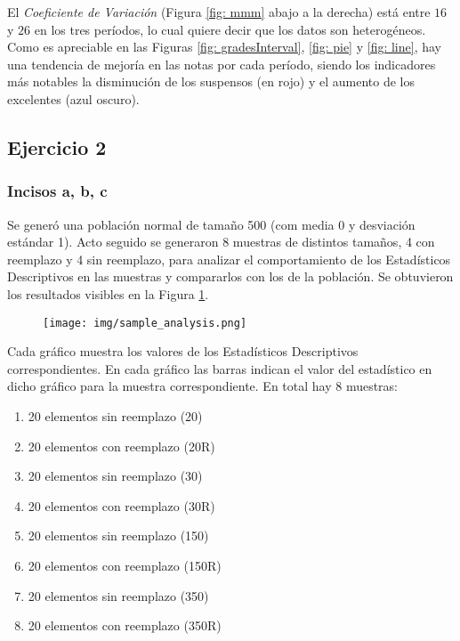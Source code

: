 \documentclass[a4paper,10pt,twocolumn]{article}
\begin{document}
	El \emph{Coeficiente de Variación} (Figura \ref{fig: mmm} abajo a la derecha) está entre $16$ y $26$ en los tres períodos, lo cual quiere decir que los datos son heterogéneos.\\
	
	Como es apreciable en las Figuras \ref{fig: gradesInterval}, \ref{fig: pie} y \ref{fig: line}, hay una tendencia de mejoría en las notas por cada período, siendo los indicadores más notables la disminución de los suspensos (en rojo) y el aumento de los excelentes (azul oscuro). \\
	\subsection{Ejercicio 2}\label{sub:results2}
		\subsubsection{Incisos a, b, c}
		Se generó una población normal de tamaño 500 (com media 0 y desviación estándar 1). Acto seguido se generaron 8 muestras de distintos tamaños, 4 con reemplazo y 4 sin reemplazo, para analizar el comportamiento de los Estadísticos Descriptivos en las muestras y compararlos con los de la población. Se obtuvieron los resultados visibles en la Figura \ref{fig: dcb}. \\
		
		\begin{figure}[htb]
			\begin{center}
				\texttt{[image: img/sample\_analysis.png]}
			\end{center}
			\label{fig: dcb}
		\end{figure}
		
		Cada gráfico muestra los valores de los Estadísticos Descriptivos correspondientes. En cada gráfico las barras indican el valor del estadístico en dicho gráfico para la muestra correspondiente. En total hay 8 muestras:
		
		\begin{enumerate}
			\item 20 elementos sin reemplazo (20)
			\item 20 elementos con reemplazo (20R)
			
			\item 20 elementos sin reemplazo (30)
			\item 20 elementos con reemplazo (30R)
			
			\item 20 elementos sin reemplazo (150)
			\item 20 elementos con reemplazo (150R)
			
			\item 20 elementos sin reemplazo (350)
			\item 20 elementos con reemplazo (350R)
		\end{enumerate}
		
\end{document}

